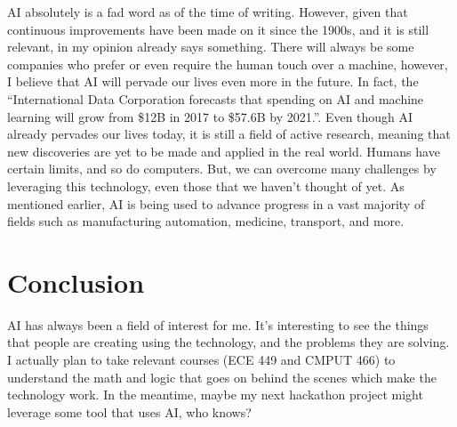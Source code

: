\documentclass[letterpaper,12pt]{article}
\begin{document}
AI absolutely is a fad word as of the time of writing. However, given that continuous improvements
have been made on it since the 1900s, and it is still relevant, in my opinion already says something.
There will always be some companies who prefer or even require the human touch
over a machine, however, I believe that AI will pervade our lives even more in the future.
In fact, the 
``International Data Corporation forecasts that spending on AI and machine learning will grow from \$12B in 2017 to \$57.6B by 2021.''.
\cite{forbesprojected}
Even though AI already pervades our lives today, 
it is still a field of active research\cite{uofaAI}, meaning that new
discoveries are yet to be made and applied in the real world.
Humans have certain limits, and so do computers. But, we can overcome many challenges by leveraging this technology,
even those that we haven't thought of yet. 
As mentioned earlier,
AI is being used to advance progress in a vast majority of fields
such as manufacturing automation, medicine, transport, and more.

\section{Conclusion}

AI has always been a field of interest for me.
It's interesting to see the things that people are creating
using the technology, and the problems they are solving.
I actually plan to take relevant courses (ECE 449 and CMPUT 466)
to understand the math and logic that goes on behind the scenes
which make the technology work. In the meantime, maybe my next
hackathon project might leverage some tool that uses AI, who knows?


\singlespacing
\nocite{*}
\printbibliography
% 
% 
\end{document}
